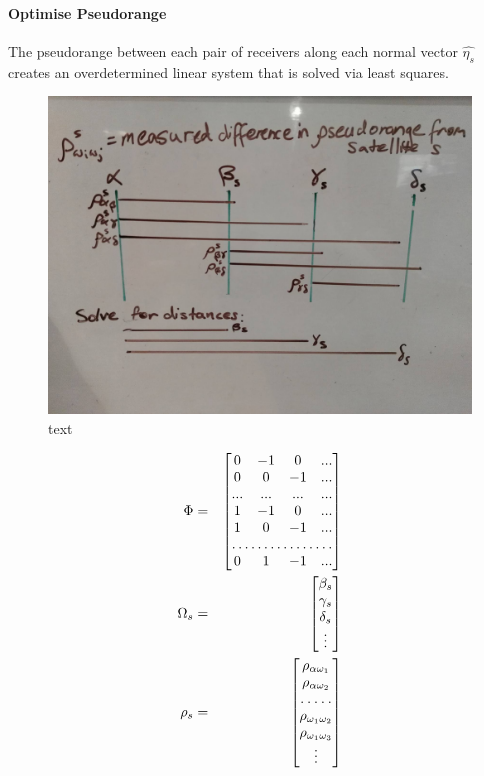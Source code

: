 \paragraph{Optimise Pseudorange}
The pseudorange between each pair of receivers along each normal vector $\hat{\eta_s}$ creates an overdetermined linear system that is solved via least squares.
\begin{figure}
\centering
\caption{text}
\label{key}
\includegraphics[width=0.7\linewidth]{ChapterPerception/Figures/solve_distances.jpg}
\end{figure}
\begin{eqnarray}
\Phi &=& \begin{bmatrix}
0 & -1 & 0 & ...\\
0 & 0 & -1 & ...\\
... & ... & ... & ... \\
1 & -1 & 0 & ...\\
1 & 0 & -1 & ...\\
\hdotsfor{4} \\
0 & 1 & -1 & ...
\end{bmatrix} \\
%
\Omega_s &=& \begin{bmatrix}
\beta_s \\
\gamma_s\\
\delta_s \\
\vdots
\end{bmatrix} \\
%
\rho_s &=& \begin{bmatrix}
\rho_{\alpha\omega_1}\\
\rho_{\alpha\omega_2}\\
\hdotsfor{1}\\
\rho_{\omega_1\omega_2}\\
\rho_{\omega_1\omega_3}\\
\vdots
\end{bmatrix} 
\end{eqnarray}

